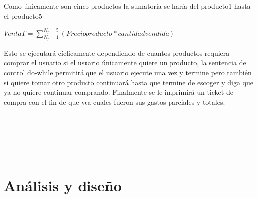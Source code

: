 \documentclass[letter,twocolumn]{revtex4}
\begin{document}
                 Como únicamente son cinco productos la sumatoria se haría del producto1 hasta el producto5
        
                \begin{center}
                       $VentaT = \sum\limits_{N_p=1}^{N_p=5} (Precioproducto*cantidadvendida)$
                \end{center}
    
    Esto se ejecutará  cíclicamente dependiendo de cuantos productos requiera comprar el usuario  si el usuario únicamente quiere un producto,  la sentencia de control do-while permitirá que el usuario ejecute una vez y termine pero también si quiere tomar otro producto continuará hasta que termine de escoger y diga que ya no quiere continuar comprando. Finalmente se le imprimirá un ticket de compra con el fin de que vea cuales fueron sus gastos parciales y totales. 
    \\\\\\\\\\\\


\section{Análisis y diseño}
\end{document}
